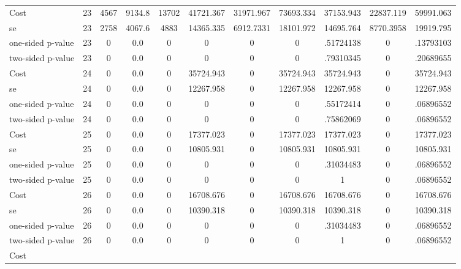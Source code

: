 \begin{tabular}{lcccccccccc}
 Cost 			  &        23 &      4567 &    9134.8 &     13702 & 41721.367 & 31971.967 & 73693.334 & 37153.943 & 22837.119 & 59991.063 \\  
 se 				 &    23 &      2758 &    4067.6 &      4883 & 14365.335 & 6912.7331 & 18101.972 & 14695.764 & 8770.3958 & 19919.795 \\  
 one-sided p-value&       23 &         0 &       0.0 &         0 & 0 & 0 & 0 & .51724138 & 0 & .13793103 \\  
 two-sided p-value&       23 &         0 &       0.0 &         0 & 0 & 0 & 0 & .79310345 & 0 & .20689655 \\  
Cost 			  &        24 &         0 &       0.0 &         0 & 35724.943 & 0 & 35724.943 & 35724.943 & 0 & 35724.943 \\  
se 				 &        24 &         0 &       0.0 &         0 & 12267.958 & 0 & 12267.958 & 12267.958 & 0 & 12267.958 \\  
one-sided p-value&        24 &         0 &       0.0 &         0 & 0 & 0 & 0 & .55172414 & 0 & .06896552 \\  
two-sided p-value&        24 &         0 &       0.0 &         0 & 0 & 0 & 0 & .75862069 & 0 & .06896552 \\  
Cost 			  &        25 &         0 &       0.0 &         0 & 17377.023 & 0 & 17377.023 & 17377.023 & 0 & 17377.023 \\  
se 				 &        25 &         0 &       0.0 &         0 & 10805.931 & 0 & 10805.931 & 10805.931 & 0 & 10805.931 \\  
one-sided p-value&        25 &         0 &       0.0 &         0 & 0 & 0 & 0 & .31034483 & 0 & .06896552 \\  
two-sided p-value&        25 &         0 &       0.0 &         0 & 0 & 0 & 0 & 1 & 0 & .06896552 \\  
Cost 			  &        26 &         0 &       0.0 &         0 & 16708.676 & 0 & 16708.676 & 16708.676 & 0 & 16708.676 \\  
se 				 &        26 &         0 &       0.0 &         0 & 10390.318 & 0 & 10390.318 & 10390.318 & 0 & 10390.318 \\  
one-sided p-value&        26 &         0 &       0.0 &         0 & 0 & 0 & 0 & .31034483 & 0 & .06896552 \\  
two-sided p-value&        26 &         0 &       0.0 &         0 & 0 & 0 & 0 & 1 & 0 & .06896552 \\  
Cost 			  &       \hline \hline \end{tabular}
